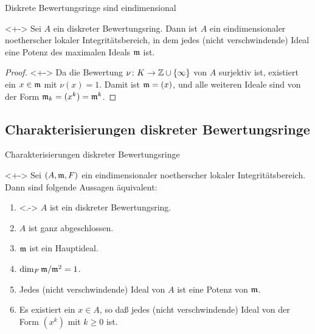 \begin{frame}{Diskrete Bewertungsringe sind eindimensional}
	\begin{proposition}<+->
		Sei \(A\) ein diskreter Bewertungsring.
		Dann ist \(A\) ein eindimensionaler noetherscher lokaler Integritätsbereich,
		in dem jedes (nicht verschwindende) Ideal eine Potenz des
		maximalen Ideals \(\mathfrak{m}\) ist.
	\end{proposition}
	\begin{proof}<+->
		Da die Bewertung \(\nu\colon K \to \mathbb Z \cup \{\infty\}\) von \(A\) surjektiv ist, existiert ein \(x \in \mathfrak{m}\)
		mit \(\nu(x) = 1\). Damit ist \(\mathfrak{m} = (x)\), und alle weiteren Ideale sind von der Form \(\mathfrak{m}_k = (x^k) = \mathfrak{m}^k\).
	\end{proof}
\end{frame}

\subsection{Charakterisierungen diskreter Bewertungsringe}

\begin{frame}{Charakterisierungen diskreter Bewertungsringe}
	\begin{proposition}<+->
		Sei \((A, \mathfrak{m}, F)\) ein eindimensionaler noetherscher lokaler Integritätsbereich.
		Dann sind folgende Aussagen äquivalent:
		\begin{enumerate}[<+->]
		\item<.->
			\(A\) ist ein diskreter Bewertungsring.
		\item
			\(A\) ist ganz abgeschlossen.
		\item
			\(\mathfrak{m}\) ist ein Hauptideal.
		\item
			\(\dim_F \mathfrak{m}/\mathfrak{m}^2 = 1\).
		\item
			Jedes (nicht verschwindende) Ideal von \(A\) ist eine Potenz von \(\mathfrak{m}\).
		\item
			Es existiert ein \(x \in A\), so daß jedes (nicht verschwindende) Ideal von der Form
			\((x^k)\) mit \(k \ge 0\) ist.
		\end{enumerate}
	\end{proposition}
\end{frame}

